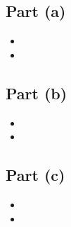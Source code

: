 \documentclass[a4paper,12pt]{article}
\begin{document}
\subsection*{Part (a)}

\begin{itemize}
\item
\item
\end{itemize}



\subsection*{Part (b)}

\begin{itemize}
\item
\item
\end{itemize}




\subsection*{Part (c)}

\begin{itemize}
\item
\item
\end{itemize}

\end{document}
